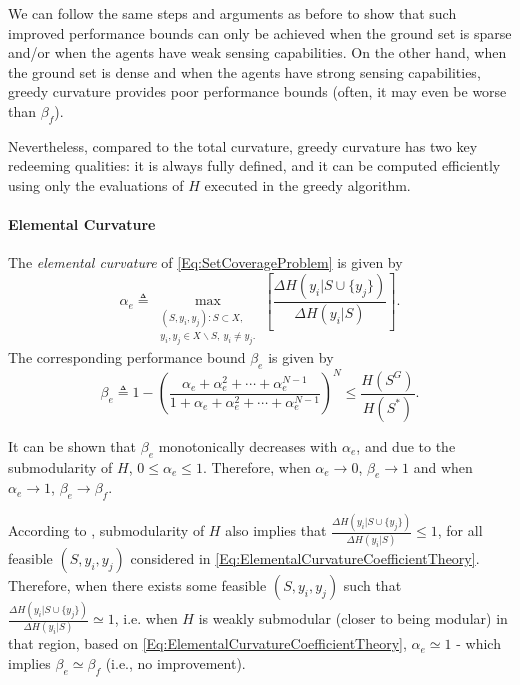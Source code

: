 \documentclass[letterpaper, 10 pt, conference]{ieeeconf}
\begin{document}
We can follow the same steps and arguments as before to show that such improved performance bounds can only be achieved when the ground set is sparse and/or when the agents have weak sensing capabilities. On the other hand, when the ground set is dense and when the agents have strong sensing capabilities, greedy curvature provides poor performance bounds (often, it may even be worse than $\beta_f$). 

Nevertheless, compared to the total curvature, greedy curvature has two key redeeming qualities: it is always fully defined, and it can be computed efficiently using only the evaluations of $H$ executed in the greedy algorithm.





\paragraph{\textbf{Elemental Curvature \cite{Wang2016}}}
The \emph{elemental curvature} of \eqref{Eq:SetCoverageProblem} is given by 
\begin{equation}\label{Eq:ElementalCurvatureCoefficientTheory}
    \alpha_e \triangleq \max_{\substack{(S,y_i,y_j): S \subset X,\\ y_i,y_j \in X \backslash S,\ y_i \neq y_j.}}\left[\frac{\Delta H(y_i \vert S \cup \{y_j\})}{\Delta H(y_i \vert S)}\right].
\end{equation}
The corresponding performance bound $\beta_e$ is given by 
\begin{equation}\label{Eq:ElementalCurvatureBoundTheory}
    \beta_e \triangleq 1-\left(\frac{\alpha_e + \alpha_e^2 + \cdots + \alpha_e^{N-1}}{1 + \alpha_e + \alpha_e^2 + \cdots + \alpha_e^{N-1}}\right)^N \leq \frac{H(S^G)}{H(S^*)}.
\end{equation}



It can be shown that $\beta_e$ monotonically decreases with $\alpha_e$, and due to the submodularity of $H$, $0 \leq \alpha_e \leq 1$. Therefore, when $\alpha_e \rightarrow 0$, $\beta_e \rightarrow 1$ and when $\alpha_e \rightarrow 1$, $\beta_e \rightarrow \beta_f$.

According to  \cite[Prop. 2.1]{Nemhauser1978}, submodularity of $H$ also implies that $\frac{\Delta H(y_i \vert S \cup \{y_j\})}{\Delta H(y_i \vert S)} \leq 1$, for all feasible $(S,y_i,y_j)$ considered in \eqref{Eq:ElementalCurvatureCoefficientTheory}. Therefore, when there exists some feasible $(S,y_i,y_j)$ such that  $\frac{\Delta H(y_i \vert S \cup \{y_j\})}{\Delta H(y_i \vert S)} \simeq 1$, i.e. when $H$ is weakly submodular (closer to being modular) in that region, based on \eqref{Eq:ElementalCurvatureCoefficientTheory}, $\alpha_e \simeq 1$ - which implies $\beta_e \simeq \beta_f$ (i.e., no improvement). 
\end{document}
